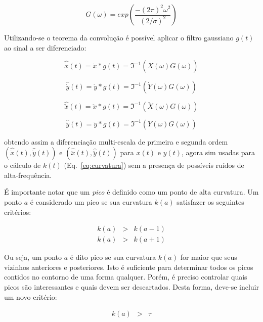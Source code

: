 \begin{equation}
G(\omega) = exp \left( \frac{-(2\pi)^2\omega^2}{(2/\sigma)^2} \right)
\end{equation}

Utilizando-se o teorema da convolução é possível aplicar o filtro
gaussiano $g(t)$ ao sinal a ser diferenciado:

\begin{equation}
\hat{\dot{x}}(t) = \dot{x} \ast g(t) = \Im^{-1}\left( \dot{X}(\omega) G(\omega) \right)
\end{equation}

\begin{equation}
\hat{\dot{y}}(t) = \dot{y} \ast g(t) = \Im^{-1}\left( \dot{Y}(\omega) G(\omega) \right)
\end{equation}

\begin{equation}
\hat{\ddot{x}}(t) = \ddot{x} \ast g(t) = \Im^{-1}\left( \ddot{X}(\omega) G(\omega) \right)
\end{equation}

\begin{equation}
\hat{\ddot{y}}(t) = \ddot{y} \ast g(t) = \Im^{-1}\left( \ddot{Y}(\omega) G(\omega) \right)
\end{equation}

\noindent obtendo assim a diferenciação multi-escala de primeira e
segunda ordem $(\hat{\dot{x}}(t),\hat{\dot{y}}(t))$ e
$(\hat{\ddot{x}}(t),\hat{\ddot{y}}(t))$ para $x(t)$ e $y(t)$, agora
sim usadas para o cálculo de $k(t)$ (Eq.~\ref{eq:curvatura}) sem a
presença de possíveis ruídos de alta-frequência.

É importante notar que um \emph{pico} é definido como um ponto de alta
curvatura. Um ponto $a$ é considerado um pico se sua curvatura $k(a)$
satisfazer os seguintes critérios:

\begin{eqnarray}
	k(a) & > & k(a-1) \\
	k(a) & > & k(a+1)
\end{eqnarray}

Ou seja, um ponto $a$ é dito pico se sua curvatura $k(a)$ for maior
que seus vizinhos anteriores e posteriores. Isto é suficiente para
determinar todos os picos contidos no contorno de uma forma
qualquer. Porém, é preciso controlar quais picos são interessantes e
quais devem ser descartados. Desta forma, deve-se incluir um novo
critério:

\begin{eqnarray}
  k(a) & > & \tau
\end{eqnarray}

